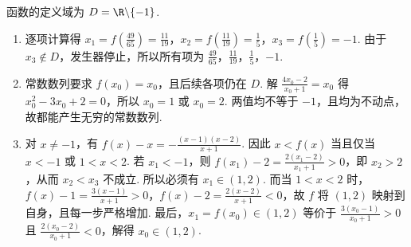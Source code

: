 \begin{solution}
函数的定义域为 \(D=\R\backslash\{-1\}\).

\begin{enumerate}
\item 逐项计算得 \(x_1=f\left(\frac{49}{65}\right)=\frac{11}{19}\)，\(x_2=f\left(\frac{11}{19}\right)=\frac15\)，\(x_3=f\left(\frac15\right)=-1\). 由于 \(x_3\notin D\)，发生器停止，所以所有项为 \(\frac{49}{65}\)，\(\frac{11}{19}\)，\(\frac15\)，\(-1\).
\item 常数数列要求 \(f(x_0)=x_0\)，且后续各项仍在 \(D\). 解 \(\frac{4x_0-2}{x_0+1}=x_0\) 得 \(x_0^2-3x_0+2=0\)，所以 \(x_0=1\) 或 \(x_0=2\). 两值均不等于 \(-1\)，且均为不动点，故都能产生无穷的常数数列.
\item 对 \(x\ne-1\)，有 \(f(x)-x=-\frac{(x-1)(x-2)}{x+1}\). 因此 \(x<f(x)\) 当且仅当 \(x<-1\) 或 \(1<x<2\). 若 \(x_1<-1\)，则 \(f(x_1)-2=\frac{2(x_1-2)}{x_1+1}>0\)，即 \(x_2>2\)，从而 \(x_2<x_3\) 不成立. 所以必须有 \(x_1\in(1,2)\). 而当 \(1<x<2\) 时，\(f(x)-1=\frac{3(x-1)}{x+1}>0\)，\(f(x)-2=\frac{2(x-2)}{x+1}<0\)，故 \(f\) 将 \((1,2)\) 映射到自身，且每一步严格增加. 最后，\(x_1=f(x_0)\in(1,2)\) 等价于 \(\frac{3(x_0-1)}{x_0+1}>0\) 且 \(\frac{2(x_0-2)}{x_0+1}<0\)，解得 \(x_0\in(1,2)\).
\end{enumerate}
\end{solution}
